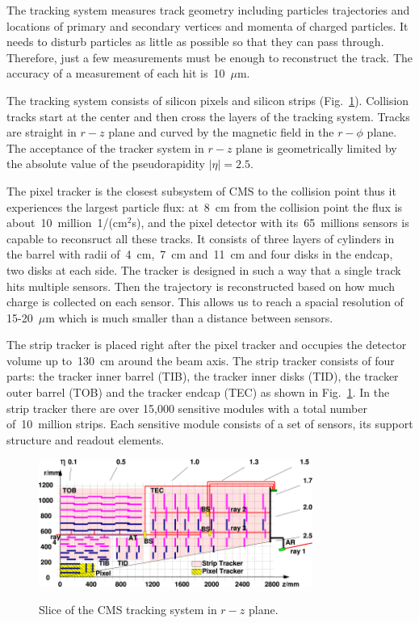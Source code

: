 The tracking system measures track geometry including particles trajectories and locations of primary and secondary vertices and momenta of charged particles. It needs to disturb particles as little as possible so that they can pass through. Therefore, just a few measurements must be enough to reconstruct the track. The accuracy of a measurement of each hit is~10~$\mu$m.

The tracking system consists of silicon pixels and silicon strips (Fig.~\ref{fig:tracker_slice}). Collision tracks start at the center and then cross the layers of the tracking system. Tracks are straight in $r-z$ plane and curved by the magnetic field in the $r-\phi$ plane. The acceptance of the tracker system in $r-z$ plane is geometrically limited by the absolute value of the pseudorapidity $|\eta|=2.5$.

The pixel tracker is the closest subsystem of CMS to the collision point thus it experiences the largest particle flux: at~8~cm from the collision point the flux is about~10~million~1/(cm$^2$s), and the pixel detector with its~65~millions sensors is capable to reconsruct all these tracks. It consists of three layers of cylinders in the barrel with radii of~4~cm,~7~cm and~11~cm and four disks in the endcap, two disks at each side. The tracker is designed in such a way that a single track hits multiple sensors. Then the trajectory is reconstructed based on how much charge is collected on each sensor. This allows us to reach a spacial resolution of 15-20~$\mu$m which is much smaller than a distance between sensors.

The strip tracker is placed right after the pixel tracker and occupies the detector volume up to~130~cm around the beam axis. The strip tracker consists of four parts: the tracker inner barrel (TIB), the tracker inner disks (TID), the tracker outer barrel (TOB) and the tracker endcap (TEC) as shown in Fig.~\ref{fig:tracker_slice}. In the strip tracker there are over 15,000 sensitive modules with a total number of~10~million strips. Each sensitive module consists of a set of sensors, its support structure and readout elements.



\begin{figure}[htb]
  \begin{center}
    {\includegraphics[width=0.8\textwidth]{../figs/Exp/tracker_slice.png}}
    \caption{Slice of the CMS tracking system in $r-z$ plane.}
    \label{fig:tracker_slice}
  \end{center}
\end{figure}

